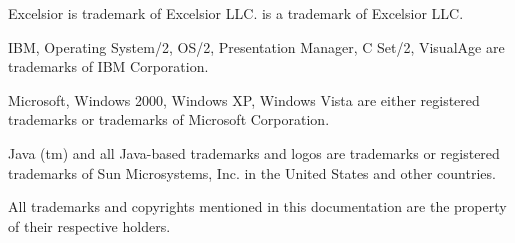 \begin{titlepage}
{\ifjava
Excelsior \JET{} is trademark of Excelsior LLC. %
\else
\XDS{} is a trademark of Excelsior LLC. %
\fi

\ifcommon \else %
  \ifosii
    IBM, Operating System/2, OS/2, Presentation Manager, C Set/2, VisualAge
    are trademarks of IBM Corporation.
  \fi

  \ifwinnt
    Microsoft, Windows 2000, Windows XP, Windows Vista are
    either registered trademarks or trademarks of Microsoft Corporation.
  \fi
\fi

\ifjava
  Java (tm) and all Java-based trademarks and logos are trademarks or
  registered trademarks of Sun Microsystems, Inc. in the United States and
  other countries. 
\fi

All trademarks and copyrights mentioned in this documentation are
the property of their respective holders.

} %
\end{titlepage}
